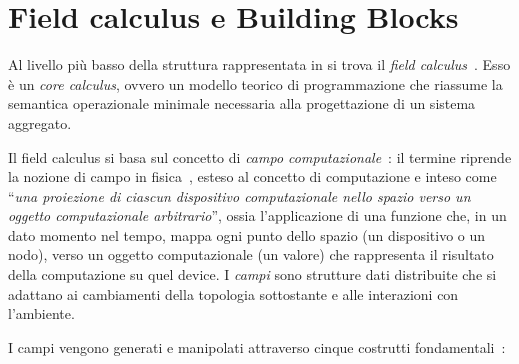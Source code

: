 \section{Field calculus e Building Blocks}\label{sec:field-calculus}

Al livello più basso della struttura rappresentata in  si trova il \emph{field calculus}~\cite{tocl}.
Esso è un \emph{core calculus}, ovvero un modello teorico di programmazione che riassume la semantica operazionale minimale necessaria alla progettazione di un sistema aggregato.

Il field calculus si basa sul concetto di \emph{campo computazionale}~\cite{FieldCalculusFOCLASA2013,tocl}:
il termine riprende la nozione di campo in fisica~\cite{mcmullin2002origins}, esteso al concetto di computazione
e inteso come \enquote{\emph{una proiezione di ciascun dispositivo computazionale nello spazio verso un oggetto computazionale arbitrario}},
ossia l'applicazione di una funzione che, in un dato momento nel tempo, mappa ogni punto dello spazio (un dispositivo o un nodo),
verso un oggetto computazionale (un valore) che rappresenta il risultato della computazione su quel device.
I \emph{campi} sono strutture dati distribuite che si adattano ai cambiamenti della topologia sottostante e alle interazioni con l'ambiente.

I campi vengono generati e manipolati attraverso cinque costrutti fondamentali~\cite{tocl}:

